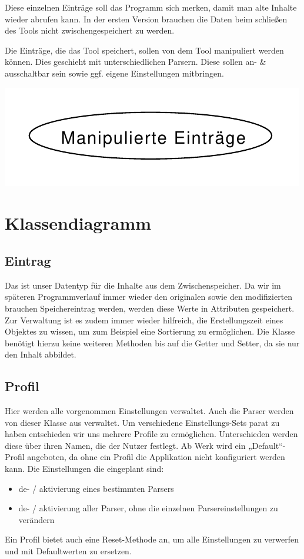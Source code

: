 \documentclass[a4paper,11pt,abstracton,titlepage]{scrartcl}
\begin{document}
Diese einzelnen Einträge soll das Programm sich merken, damit man alte Inhalte
wieder abrufen kann. In der ersten Version brauchen die Daten beim schließen des
Tools nicht zwischengespeichert zu werden.

Die Einträge, die das Tool speichert, sollen von dem Tool manipuliert werden
können. Dies geschieht mit unterschiedlichen Parsern. Diese sollen an- &
ausschaltbar sein sowie ggf. eigene Einstellungen mitbringen.

\includegraphics[width=\dimexpr\textwidth-2\tabcolsep-2pt\relax]{../OOA/Use-Case/1-usecase.pdf}

\section{Klassendiagramm}
\subsection{Eintrag}
Das ist unser Datentyp für die Inhalte aus dem Zwischenspeicher. Da wir im
späteren Programmverlauf immer wieder den originalen sowie den modifizierten
brauchen Speichereintrag werden, werden diese Werte in Attributen gespeichert.
Zur Verwaltung ist es zudem immer wieder hilfreich, die Erstellungszeit eines
Objektes zu wissen, um zum Beispiel eine Sortierung zu ermöglichen. Die Klasse
benötigt hierzu keine weiteren Methoden bis auf die Getter und Setter, da sie
nur den Inhalt abbildet.

\subsection{Profil}
Hier werden alle vorgenommen Einstellungen verwaltet. Auch die Parser werden von
dieser Klasse aus verwaltet.  Um verschiedene Einstellungs-Sets parat zu haben
entschieden wir uns mehrere Profile zu ermöglichen. Unterschieden werden diese
über ihren Namen, die der Nutzer festlegt. Ab Werk wird ein „Default“-Profil
angeboten, da ohne ein Profil die Applikation nicht konfiguriert werden kann.
Die Einstellungen die eingeplant sind:
\begin{itemize}
	\item de- / aktivierung eines bestimmten Parsers
	\item de- / aktivierung aller Parser, ohne die einzelnen Parsereinstellungen
zu verändern
\end{itemize}
Ein Profil bietet auch eine Reset-Methode an, um alle Einstellungen zu
verwerfen und mit Defaultwerten zu ersetzen.
\end{document}
